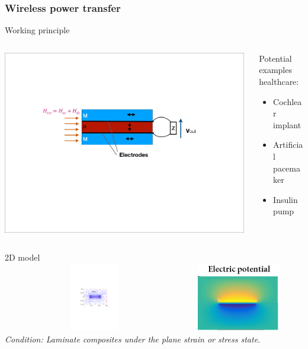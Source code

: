 \documentclass[compress]{beamer}
\begin{document}

\begin{frame}\frametitle{Wireless power transfer}
\vspace{-10.5pt}
\begin{block}{Working principle}
\begin{columns}[totalwidth=\textwidth] 
   \begin{column}{.69\textwidth}
\includegraphics[width=0.99\textwidth]{Graphic/01_energharveprinc.pdf}
	\end{column}
	\begin{column}{.3\textwidth}
	Potential examples healthcare:
	\begin{itemize}[label=$\bullet$, font=\small, leftmargin=*]
	\item Cochlear implant
	\item Artificial pacemaker
	\item Insulin pump
	\end{itemize}
	\end{column}
\end{columns}
\end{block}
2D model\\
    {
     \includegraphics[height=3cm, width=0.6\textwidth]{Graphic/01_2dmesh.pdf}
     \includegraphics[height=3cm, width=0.35\textwidth]{Graphic/01_2dresult.png}
    }
    {\color{red}\textit{Condition: Laminate composites under the plane strain or stress state.}}
\end{frame}
\end{document}

